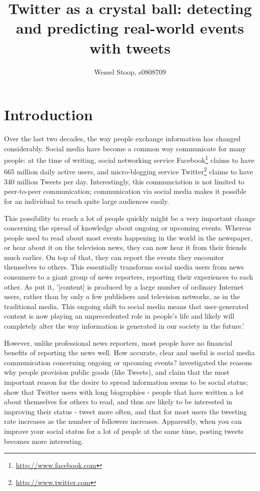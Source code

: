\documentclass[12pt]{article}
\title{Twitter as a crystal ball: detecting and predicting real-world events with tweets}
\author{Wessel Stoop, s0808709}
\begin{document}
\maketitle

\section{Introduction}
Over the last two decades, the way people exchange information has changed considerably. Social media have become a common way communicate for many people: at the time of writing, social networking service Facebook\footnote{\url{http://www.facebook.com}} claims to have 665 million daily active users, and micro-blogging service Twitter\footnote{\url{http://www.twitter.com}} claims to have 340 million Tweets per day. Interestingly, this communciation is not limited to peer-to-peer communication; communication via social media makes it possible for an individual to reach quite large audiences easily. 

This possibility to reach a lot of people quickly might be a very important change concerning the spread of knowledge about ongoing or upcoming events. Whereas people used to read about most events happening in the world in the newspaper, or hear about it on the television news, they can now hear it from their friends much earlier. On top of that, they can report the events they encounter themselves to others. This essentially transforms social media users from news consumers to a giant group of news reporters, reporting their experiences to each other. As  put it, '[content] is produced by a large number of ordinary Internet users, rather than by only a few publishers and television networks, as in the traditional media. This ongoing shift to social media means that user-generated content is now playing an unprecedented role in people’s life and likely will completely alter the way information is generated in our society in the future.'

However, unlike professional news reporters, most people have no financial benefits of reporting the news well. How accurate, clear and useful is social media communication concerning ongoing or upcoming events?  investigated the reasons why people provision public goods (like Tweets), and claim that the most important reason for the desire to spread information seems to be social status;  show that Twitter users with long biographies - people that have written a lot about themselves for others to read, and thus are likely to be interested in improving their status - tweet more often, and that for most users the tweeting rate increases as the number of followers increases. Apparently, when you can improve your social status for a lot of people at the same time, posting tweets becomes more interesting.
\end{document}
